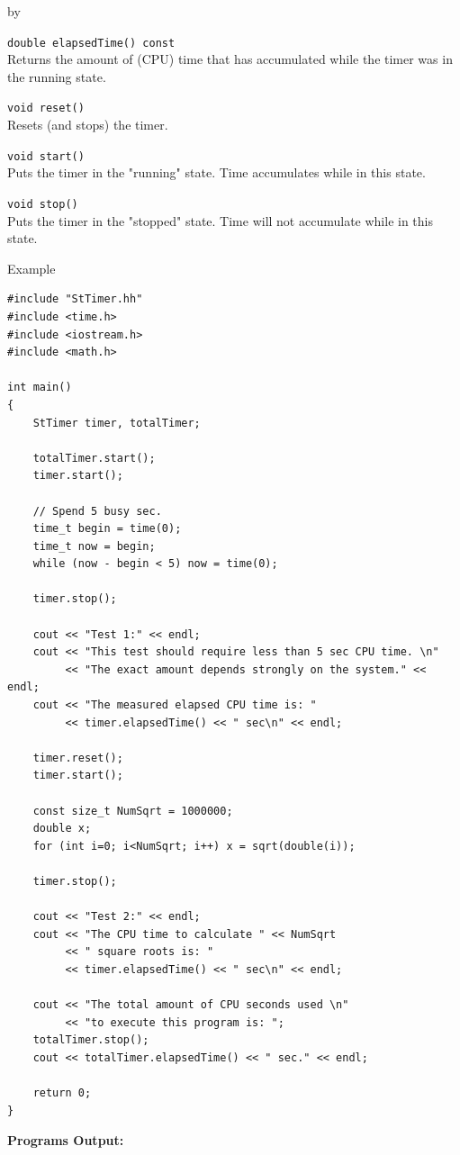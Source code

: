 \documentclass[twoside]{article}
\newcommand{\entrylabel}[1]{\mbox{\textbf{{#1}}}\hfil}%
\newenvironment{entry}
{\begin{list}{}%
    {\renewcommand{\makelabel}{\entrylabel}%
     \setlength{\labelwidth}{90pt}%
     \setlength{\leftmargin}{\labelwidth}
     \advance\leftmargin by \labelsep%
      }%
    }%
  {\end{list}}
\newcommand{\Entrylabel}[1]%
{\raisebox{0pt}[1ex][0pt]{\makebox[\labelwidth][l]%
    {\parbox[t]{\labelwidth}{\hspace{0pt}\textbf{{#1}}}}}}
\newenvironment{Entry}%
{\renewcommand{\entrylabel}{\Entrylabel}\begin{entry}}%
  {\end{entry}}
\begin{document}
\begin{description}
\begin{Entry}
    \verb+double elapsedTime() const+\\
    Returns the amount of (CPU) time that has accumulated while
    the timer was in the running state.
 
    \verb+void reset()+\\
    Resets (and stops) the timer.
 
    \verb+void start()+\\
    Puts the timer in the "running" state. Time accumulates while
    in this state.

    \verb+void stop()+\\
    Puts the timer in the "stopped" state. Time will not accumulate
    while in this state.

\item[Example]
{\footnotesize
\begin{verbatim}
#include "StTimer.hh"
#include <time.h>
#include <iostream.h>
#include <math.h>

int main()
{   
    StTimer timer, totalTimer;
    
    totalTimer.start();
    timer.start();
    
    // Spend 5 busy sec.
    time_t begin = time(0);
    time_t now = begin;
    while (now - begin < 5) now = time(0);
    
    timer.stop();
    
    cout << "Test 1:" << endl;
    cout << "This test should require less than 5 sec CPU time. \n"
         << "The exact amount depends strongly on the system." << endl;
    cout << "The measured elapsed CPU time is: "
         << timer.elapsedTime() << " sec\n" << endl;
    
    timer.reset();
    timer.start();
    
    const size_t NumSqrt = 1000000;
    double x;
    for (int i=0; i<NumSqrt; i++) x = sqrt(double(i));
    
    timer.stop();
    
    cout << "Test 2:" << endl;
    cout << "The CPU time to calculate " << NumSqrt
         << " square roots is: "
         << timer.elapsedTime() << " sec\n" << endl;
    
    cout << "The total amount of CPU seconds used \n"
         << "to execute this program is: ";
    totalTimer.stop();
    cout << totalTimer.elapsedTime() << " sec." << endl;
    
    return 0;
}
\end{verbatim}

{\bf Programs Output:}

}
\end{Entry}
\end{description}
\end{document}

